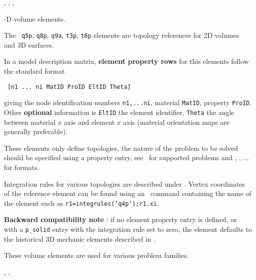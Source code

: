 
\melastic, \pshell, \femk, \feplot 


-D volume elements. 


The \qfourp\, {\tt q5p}, {\tt q8p}, {\tt q9a}, {\tt t3p}, {\tt t6p} elements are topology references for 2D volumes and 3D surfaces.


In a model description matrix, {\bf element property rows} for this  elements follow the standard format

\begin{verbatim}
 [n1 ... ni MatID ProID EltID Theta] 
\end{verbatim}


giving the node identification numbers {\tt n1,...ni}, material {\tt MatID}, property {\tt ProID}. Other {\bf optional} information is {\tt EltID} the element identifier, {\tt Theta} the angle between material $x$ axis and element $x$ axis (material orientation maps are generally preferable).


These elements only define topologies, the nature of the problem to be solved should be specified using a property entry, see~ for supported problems and  \psolid, \pheat, ... for formats. 


Integration rules for various topologies are described under \integrules. Vertex coordinates of the reference element can be found using an \integrules\ command containing the name of the element such as {\tt r1=integrules('q4p');r1.xi}.


{\bf Backward compatibility note} : if no element property entry is defined, or with a {\tt p\_solid} entry with the integration rule set to zero, the element defaults to the historical 3D mechanic elements described in . 



These volume elements are used for various problem families.



\femat, \femk, \feplot 






